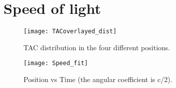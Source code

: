 \section*{Speed of light}
\lipsum[1]
\begin{figure}[h!]
\centering
\texttt{[image: TACoverlayed\_dist]}
\caption{TAC distribution in the four different positions.}
\end{figure}
 
\begin{figure}[h!]
\centering
\texttt{[image: Speed\_fit]}
\caption{Position vs Time (the angular coefficient is c/2).}
\end{figure}
